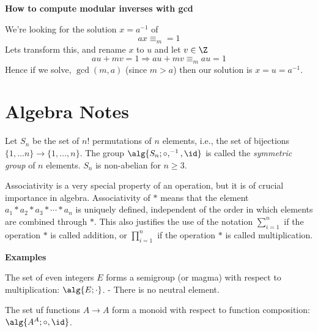 
\textbf{How to compute modular inverses with gcd}


We're looking for the solution $x=a^{-1}$ of
\[
ax\equiv_m=1
\]
Lets transform this, and rename $x$ to $u$ and let $v\in \Z$
\[
au + mv = 1 \Rightarrow au+mv\equiv_m au = 1
\]
Hence if we solve, $\gcd(m,a)$ (since $m>a$) then our solution is $x=u=a^{-1}$.



\section{Algebra Notes}

\Def{*} Let $S_n$ be the set of $n!$ permutations of $n$ elements, i.e., the
set of bijections $\{1,\ldots n\}\to \{1,\ldots,n\}$. The group
$\alg{S_n;\circ,^{-1},\id}$ is called the \emph{symmetric group} of $n$
elements. $S_n$ is non-abelian for $n\geq 3$.

\Com Associativity is a very special property of an operation, but it is of
crucial importance in algebra. Associativity of $*$ means that the element
$a_1*a_2*a_3*\cdots*a_n$ is uniquely defined, independent of the order in which
elements are combined through $*$. This also justifies the use of the notation
$\sum_{i=1}^{n}$ if the operation $*$ is called addition, or $\prod_{i=1}^{n}$
if the operation $*$ is called multiplication.

\textbf{Examples}

\Ex The set of even integers $E$ forms a semigroup (or magma) with respect to
multiplication: $\alg{E;\cdot}$. - There is no neutral element.

\Ex The set uf functions $A\to A$ form a monoid with respect to function
composition: $\alg{A^{A};\circ,\id}$.

